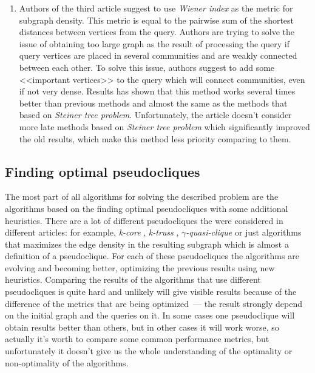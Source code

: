 \begin{enumerate}
  \item Authors of the third article \cite{Wiener15} suggest to use \textit{Wiener index} as the metric for subgraph density. This metric is equal to the pairwise sum of the shortest distances between vertices from the query. Authors are trying to solve the issue of obtaining too large graph as the result of processing the query if query vertices are placed in several communities and are weakly connected between each other. To solve this issue, authors suggest to add some <<important vertices>> to the query which will connect communities, even if not very dense. Results has shown that this method works several times better than previous methods \cite{Faloutsos06, Sozio10} and almost the same as the methods that based on \textit{Steiner tree problem}. Unfortunately, the article doesn't consider more late methods based on \textit{Steiner tree problem} which significantly improved the old results, which make this method less priority comparing to them.
  
\end{enumerate}

\subsection{Finding optimal pseudocliques}

The most part of all algorithms for solving the described problem are the algorithms based on the finding optimal pseudocliques with some additional heuristics. There are a lot of different pseudocliques the were considered in different articles: for example, \textit{k-core} \cite{Barbieri15}, \textit{k-truss} \cite{Huang15}, \textit{$\gamma$-quasi-clique} \cite{Zhu11} or just algorithms that maximizes the edge density in the resulting subgraph \cite{Wu15} which is almost a definition of a pseudoclique. For each of these pseudocliques the algorithms are evolving and becoming better, optimizing the previous results using new heuristics. Comparing the results of the algorithms that use different pseudocliques is quite hard and unlikely will give visible results because of the difference of the metrics that are being optimized~--- the result strongly depend on the initial graph and the queries on it. In some cases one pseudoclique will obtain results better than others, but in other cases it will work worse, so actually it's worth to compare some common performance metrics, but unfortunately it doesn't give us the whole understanding of the optimality or non-optimality of the algorithms.

